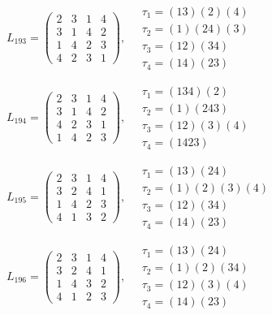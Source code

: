 $L_{193} = \begin{pmatrix} 2 & 3 & 1 & 4 \\ 3 & 1 & 4 & 2 \\ 1 & 4 & 2 & 3 \\ 4 & 2 & 3 & 1 \end{pmatrix}, \quad \begin{matrix} \tau_{1} = (1 3)(2)(4) \\ \tau_{2} = (1)(2 4)(3) \\ \tau_{3} = (1 2)(3 4) \\ \tau_{4} = (1 4)(2 3) \end{matrix}$

$L_{194} = \begin{pmatrix} 2 & 3 & 1 & 4 \\ 3 & 1 & 4 & 2 \\ 4 & 2 & 3 & 1 \\ 1 & 4 & 2 & 3 \end{pmatrix}, \quad \begin{matrix} \tau_{1} = (1 3 4)(2) \\ \tau_{2} = (1)(2 4 3) \\ \tau_{3} = (1 2)(3)(4) \\ \tau_{4} = (1 4 2 3) \end{matrix}$

$L_{195} = \begin{pmatrix} 2 & 3 & 1 & 4 \\ 3 & 2 & 4 & 1 \\ 1 & 4 & 2 & 3 \\ 4 & 1 & 3 & 2 \end{pmatrix}, \quad \begin{matrix} \tau_{1} = (1 3)(2 4) \\ \tau_{2} = (1)(2)(3)(4) \\ \tau_{3} = (1 2)(3 4) \\ \tau_{4} = (1 4)(2 3) \end{matrix}$

$L_{196} = \begin{pmatrix} 2 & 3 & 1 & 4 \\ 3 & 2 & 4 & 1 \\ 1 & 4 & 3 & 2 \\ 4 & 1 & 2 & 3 \end{pmatrix}, \quad \begin{matrix} \tau_{1} = (1 3)(2 4) \\ \tau_{2} = (1)(2)(3 4) \\ \tau_{3} = (1 2)(3)(4) \\ \tau_{4} = (1 4)(2 3) \end{matrix}$

